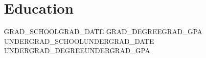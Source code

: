 \section{Education}
    \resumeSubHeadingListStart

    \resumeSubheading
    {{{GRAD_SCHOOL}}}{{{GRAD_DATE}}}
    {{{GRAD_DEGREE}}}{{{GRAD_GPA}}}
    \resumeItemListStart
    \resumeItemListEnd
    \resumeSubheading
    {{{UNDERGRAD_SCHOOL}}}{{{UNDERGRAD_DATE}}}
    {{{UNDERGRAD_DEGREE}}}{{{UNDERGRAD_GPA}}}

    \resumeSubHeadingListEnd
